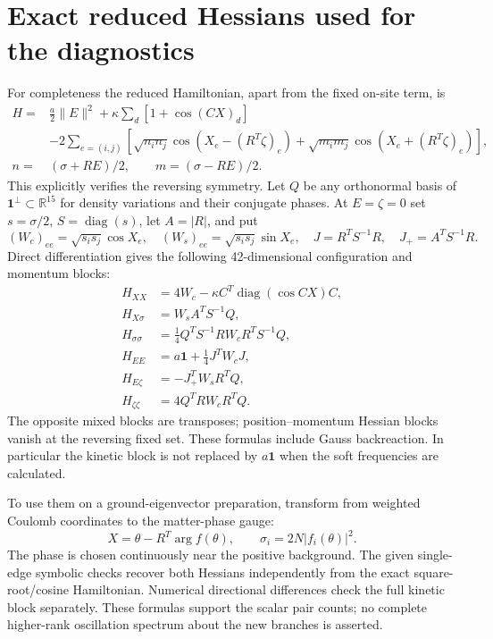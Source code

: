 \documentclass[11pt,a4paper]{article}
\newcommand{\id}{\mathbf1}\newcommand{\tr}{\operatorname{tr}}\newcommand{\diag}{\operatorname{diag}}\newcommand{\Rea}{\operatorname{Re}}
\begin{document}
\section{Exact reduced Hessians used for the diagnostics}
For completeness the reduced Hamiltonian, apart from the fixed on-site term, is
\begin{align*}
H={}&\frac a2\|E\|^2+\kappa\sum_d[1+\cos(CX)_d]\\
&-2\sum_{e=(i,j)}\left[
\sqrt{n_in_j}\cos(X_e-(R^T\zeta)_e)
+\sqrt{m_im_j}\cos(X_e+(R^T\zeta)_e)\right],\\
n={}&(\sigma+RE)/2,\qquad m=(\sigma-RE)/2.
\end{align*}
This explicitly verifies the reversing symmetry. Let $Q$ be any orthonormal basis of $\id^\perp\subset\mathbb R^{15}$ for density variations and their conjugate phases. At $E=\zeta=0$ set $s=\sigma/2$, $S=\diag(s)$, let $A=|R|$, and put
\[
(W_c)_{ee}=\sqrt{s_is_j}\cos X_e,\quad
(W_s)_{ee}=\sqrt{s_is_j}\sin X_e,\quad
J=R^TS^{-1}R,\quad J_+=A^TS^{-1}R.
\]
Direct differentiation gives the following 42-dimensional configuration and momentum blocks:
\begin{align*}
H_{XX}&=4W_c-\kappa C^T\diag(\cos CX)C,\\
H_{X\sigma}&=W_sA^TS^{-1}Q,\\
H_{\sigma\sigma}&=\frac14Q^TS^{-1}RW_cR^TS^{-1}Q,\\[3pt]
H_{EE}&=a\id+\frac14J^TW_cJ,\\
H_{E\zeta}&=-J_+^TW_sR^TQ,\\
H_{\zeta\zeta}&=4Q^TRW_cR^TQ.
\end{align*}
The opposite mixed blocks are transposes; position--momentum Hessian blocks vanish at the reversing fixed set. These formulas include Gauss backreaction. In particular the kinetic block is not replaced by $a\id$ when the soft frequencies are calculated.

To use them on a ground-eigenvector preparation, transform from weighted Coulomb coordinates to the matter-phase gauge:
\[
X=\theta-R^T\arg f(\theta),\qquad \sigma_i=2N|f_i(\theta)|^2.
\]
The phase is chosen continuously near the positive background. The given single-edge symbolic checks recover both Hessians independently from the exact square-root/cosine Hamiltonian. Numerical directional differences check the full kinetic block separately. These formulas support the scalar pair counts; no complete higher-rank oscillation spectrum about the new branches is asserted.

\newpage
\end{document}
